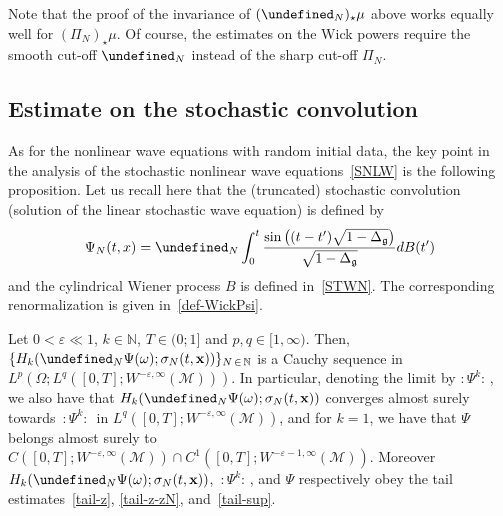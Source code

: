 \documentclass[AHL,Unicode,longabstracts,published]{cedram}
\newcommand{\N}{\mathbb{N}}
\let\P= \undefined
\newcommand{\P}{\mathbf{P}}
\newcommand{\x}{\mathbf{x}}
\newcommand{\M}{\mathcal{M}}
\newcommand{\g}{\mathfrak{g}}
\newcommand{\Dlg}{\Delta_{\g}}
\newcommand{\eps}{\varepsilon}
\newcommand{\s}{\sigma}
\renewcommand{\o}{\omega}
\renewcommand{\O}{\Omega}
\begin{document}
\begin{rema}
Note that the proof of the invariance of $(\P_N)_{\star}\mu$ above works equally well for $(\Pi_N)_{\star}\mu$. Of course, the estimates on the Wick powers require the smooth cut-off $\P_N$ instead of the sharp cut-off $\Pi_N$.
\end{rema}

\subsection{Estimate on the stochastic convolution} 
As for the nonlinear wave equations with random initial data, the key point in the analysis of the stochastic nonlinear wave equations~\eqref{SNLW} is the following proposition. Let us recall here that the (truncated) stochastic convolution (solution of the linear stochastic wave equation) is defined by
\begin{equation*}
\Psi_N(t,x)=\P_N\int_0^t\frac{\sin\big((t-t')\sqrt{1-\Dlg}\big)}{\sqrt{1-\Dlg}}dB(t')
\end{equation*}
and the cylindrical Wiener process $B$ is defined in~\eqref{STWN}. The corresponding renormalization is given in~\eqref{def-WickPsi}.

\begin{prop}\label{prop-psi}
Let $0<\eps\ll 1$, $k \in\N$, $T \in (0;1]$ and $p,q \in [1,\infty)$. Then, 
$\{H_k(\P_N\Psi(\o);\s_N(t,\x))\}_{N\,\in\,\N}$
is a Cauchy sequence in
$L^p(\O;L^q([0,T];W^{-\eps,\infty}(\M)))$. In particular, denoting the limit by $:\Psi^k\!:\,$, we also have that $H_k(\P_N\Psi(\o);\s_N(t,\x))$ converges almost surely towards $ \,:\!\Psi^k\!:\,$ in $L^q([0,T];W^{-\eps,\infty}(\M))$, and for $k=1$, we have that $\Psi$ belongs almost surely to $C([0,T];W^{-\eps,\infty}(\M))\cap C^1([0,T];W^{-\eps-1,\infty}(\M))$. Moreover $H_k(\P_N\Psi(\o);\s_N(t,\x))$, $\,:\!\Psi^k\!:\,$, and $\Psi$ respectively obey the tail estimates~\eqref{tail-z}, \eqref{tail-z-zN}, and~\eqref{tail-sup}.
\end{prop}
\end{document}
